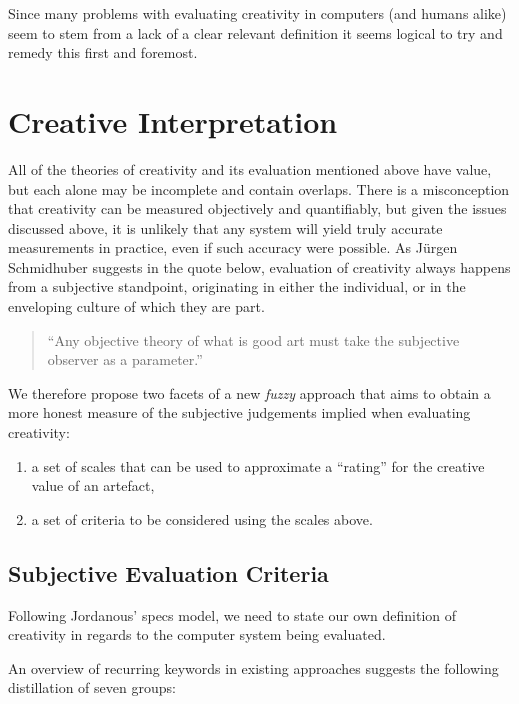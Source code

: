 Since many problems with evaluating creativity in computers (and humans alike) seem to stem from a lack of a clear relevant definition it seems logical to try and remedy this first and foremost.


\section{Creative Interpretation}

All of the theories of creativity and its evaluation mentioned above have value, but each alone may be incomplete and contain overlaps. There is a misconception that creativity can be measured objectively and quantifiably, but given the issues discussed above, it is unlikely that any system will yield truly accurate measurements in practice, even if such accuracy were possible. As J{\"u}rgen Schmidhuber suggests in the quote below, evaluation of creativity always happens from a subjective standpoint, originating in either the individual, or in the enveloping culture of which they are part.

\begin{quote}
  ``Any objective theory of what is good art must take the subjective observer as a parameter.'' \autocite{Schmidhuber2006}
\end{quote}

We therefore propose two facets of a new \textit{fuzzy} approach that aims to obtain a more honest measure of the subjective judgements implied when evaluating creativity:

\begin{enumerate}
  \item a set of scales that can be used to approximate a ``rating'' for the creative value of an artefact,
  \item a set of criteria to be considered using the scales above.
\end{enumerate}


\subsection{Subjective Evaluation Criteria}

Following Jordanous' \gls{specs} model, we need to state our own definition of creativity in regards to the computer system being evaluated.

An overview of recurring keywords in existing approaches suggests the following distillation of seven groups:

